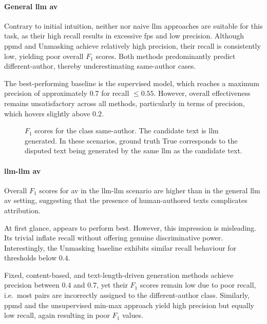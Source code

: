 \paragraph{General \ac{llm} \ac{av}}

Contrary to initial intuition, neither \mirrorMinds{} nor naive \ac{llm} approaches are suitable for this task, as their high recall results in excessive \acp{fp} and low precision.  
Although \ac{ppmd} and Unmasking achieve relatively high precision, their recall is consistently low, yielding poor overall $F_1$ scores.  
Both methods predominantly predict different-author, thereby underestimating same-author cases.  

The best-performing baseline is the supervised model, which reaches a maximum precision of approximately $0.7$ for recall $\leq 0.55$.  
However, overall effectiveness remains unsatisfactory across all methods, particularly in terms of precision, which hovers slightly above $0.2$.


\begin{figure}[h]
  \centering
  
  \caption[\ac{llm} \ac{av} $F_1$ scores.]{$F_1$ scores for the class same-author. 
The candidate text is \ac{llm} generated.
In these scenarios, ground truth True corresponds to the disputed text being generated by the same \ac{llm} as the candidate text.
}
  \label{fig:llm_av_prec}
\end{figure}



\paragraph{\ac{llm}-\ac{llm} \ac{av}}

Overall $F_1$ scores for \ac{av} in the \ac{llm}-\ac{llm} scenario are higher than in the general \ac{llm} \ac{av} setting, suggesting that the presence of human-authored texts complicates attribution.  

At first glance, \mirrorMinds{} appears to perform best. 
However, this impression is misleading.  
Its trivial \imps{} inflate recall without offering genuine discriminative power.  
Interestingly, the Unmasking baseline exhibits similar recall behaviour for thresholds below $0.4$.  

Fixed, content-based, and text-length-driven \imp{} generation methods achieve precision between $0.4$ and $0.7$, yet their $F_1$ scores remain low due to poor recall, i.e.\ most pairs are incorrectly assigned to the different-author class.  
Similarly, \ac{ppmd} and the unsupervised min-max approach yield high precision but equally low recall, again resulting in poor $F_1$ values.  

